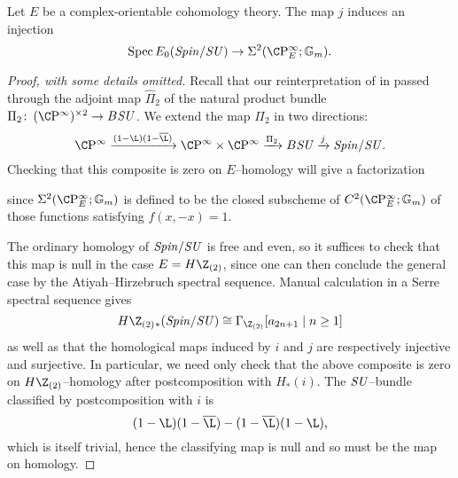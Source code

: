 \begin{lemma}\label{SpinSUComparisonMapIsInj}
Let \(E\) be a complex-orientable cohomology theory.  The map \(j\) induces an injection \[\Spec E_0(\Spin/\SU) \to \Sigma^2(\CP^\infty_E; \Gm).\]
\end{lemma}
\begin{proof}[Proof, with some details omitted]
Recall that our reinterpretation of  in  passed through the adjoint map \(\widehat \Pi_2\) of the natural product bundle \(\Pi_2\co (\CP^\infty)^{\times 2} \to B\SU\).  We extend the map \(\Pi_2\) in two directions: \[\CP^\infty \xrightarrow{(1 - \L)(1 - \overline{\L})} \CP^\infty \times \CP^\infty \xrightarrow{\Pi_2} B\SU \xrightarrow{j} \Spin/\SU.\]  Checking that this composite is zero on \(E\)--homology will give a factorization
\begin{center}
\end{center}
since \(\Sigma^2(\CP^\infty_E; \Gm)\) is defined to be the closed subscheme of \(C^2(\CP^\infty_E; \Gm)\) of those functions satisfying \(f(x, -x) = 1\).

The ordinary homology of \(\mathit{Spin}/\mathit{SU}\) is free and even, so it suffices to check that this map is null in the case \(E = H\Z_{(2)}\), since one can then conclude the general case by the Atiyah--Hirzebruch spectral sequence.  Manual calculation in a Serre spectral sequence gives \[H\Z_{(2)}{}_*(\Spin/\SU) \cong \Gamma_{\Z_{(2)}}[a_{2n+1} \mid n \ge 1]\] as well as that the homological maps induced by \(i\) and \(j\) are respectively injective and surjective.  In particular, we need only check that the above composite is zero on \(H\Z_{(2)}\)--homology after postcomposition with \(H_*(i)\).  The \(\mathit{SU}\)--bundle classified by postcomposition with \(i\) is \[(1 - \L)(1 - \overline \L) - (1 - \overline \L)(1 - \L),\] which is itself trivial, hence the classifying map is null and so must be the map on homology.


\end{proof}
